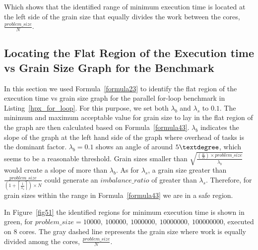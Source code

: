 Which shows that the identified range of minimum execution time is located at the left side of the grain size that equally divides the work between the cores, $\frac{problem\_{size}}{N}$.
  
\vspace{\baselineskip}
\subsection{Locating the Flat Region of the Execution time vs Grain Size Graph for the Benchmark}
In this section we used Formula~\ref{formula23} to identify the flat region of the execution time vs grain size graph for the parallel for-loop benchmark in Listing~\ref{hpx_for_loop}. For this purpose, we set  both $\lambda_{b}$ and $\lambda_{s}$ to $0.1$. The minimum and maximum acceptable value for grain size to lay in the flat region of the graph are then calculated based on Formula~\ref{formula43}. $\lambda_{b}$ indicates the slope of the graph at the left hand side of the graph where overhead of tasks is the dominant factor. $\lambda_{b}=0.1$ shows an angle of around $5\textdegree$, which seems to be a reasonable threshold. Grain sizes smaller than $\sqrt{\frac{(\frac{\alpha}{N})\times{problem\_{size}}}{{\lambda_b}}}$ would create a slope of more than $\lambda_b$. As for $\lambda_s$, a grain size greater than       
$\frac{problem\_{size}}{(1+\left\lceil{\frac{1}{\lambda_s}}\right\rceil)\times{N}}$ could generate an $imbalance\_{ratio}$ of greater than $\lambda_s$. Therefore, for grain sizes within the range in Formula~\ref{formula43} we are in a safe region. 
 
In Figure~\ref{fig51} the identified regions for minimum execution time is shown in green, for $problem\_{size}=10000,\:100000,\:1000000,\:10000000,\:100000000$, executed on $8$ cores. The gray dashed line represents the grain size where work is equally divided among the cores, $\frac{problem\_size}{N}$.

